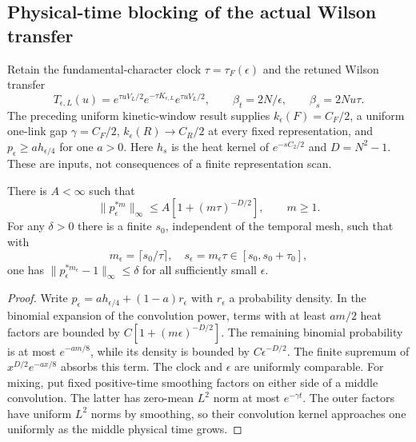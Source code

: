 \subsection{Physical-time blocking of the actual Wilson transfer}
\label{sec:wdt-blocked-vacuum}

Retain the fundamental-character clock $\tau=\tau_F(\epsilon)$ and the
retuned Wilson transfer
\[
 T_{\epsilon,L}(u)=e^{\tau uV_L/2}e^{-\tau K_{\epsilon,L}}e^{\tau uV_L/2},
 \qquad \beta_t=2N/\epsilon,\qquad \beta_s=2Nu\tau.
\]
The preceding uniform kinetic-window result supplies
$k_\epsilon(F)=C_F/2$, a uniform one-link gap $\gamma=C_F/2$,
$k_\epsilon(R)\to C_R/2$ at every fixed representation, and
$p_\epsilon\ge a h_{\epsilon/4}$ for one $a>0$. Here $h_s$ is the
heat kernel of $e^{-sC_2/2}$ and $D=N^2-1$.
These are inputs, not consequences of a finite representation scan.

\begin{lemma}
\label{lem:wdt-smoothing}
There is $A<\infty$ such that
\[
 \|p_\epsilon^{*m}\|_\infty\le A[1+(m\tau)^{-D/2}],\qquad m\ge1.
\]
For any $\delta>0$ there is a finite $s_0$, independent of the temporal
mesh, such that with
\[
 m_\epsilon=\lceil s_0/\tau\rceil,\quad
 s_\epsilon=m_\epsilon\tau\in[s_0,s_0+\tau_0],
\]
one has $\|p_\epsilon^{*m_\epsilon}-1\|_\infty\le\delta$ for all
sufficiently small $\epsilon$.
\end{lemma}
\begin{proof}
Write $p_\epsilon=a h_{\epsilon/4}+(1-a)r_\epsilon$ with
$r_\epsilon$ a probability density. In the binomial expansion of the
convolution power, terms with at least $am/2$ heat factors are bounded by
$C[1+(m\epsilon)^{-D/2}]$. The remaining binomial probability is at most
$e^{-am/8}$, while its density is bounded by $C\epsilon^{-D/2}$.
The finite supremum of $x^{D/2}e^{-ax/8}$ absorbs this term. The clock
and $\epsilon$ are uniformly comparable. For mixing, put fixed positive-time
smoothing factors on either side of a middle convolution. The latter has
zero-mean $L^2$ norm at most $e^{-\gamma t}$. The outer factors have
uniform $L^2$ norms by smoothing, so their convolution kernel approaches
one uniformly as the middle physical time grows.
\end{proof}


